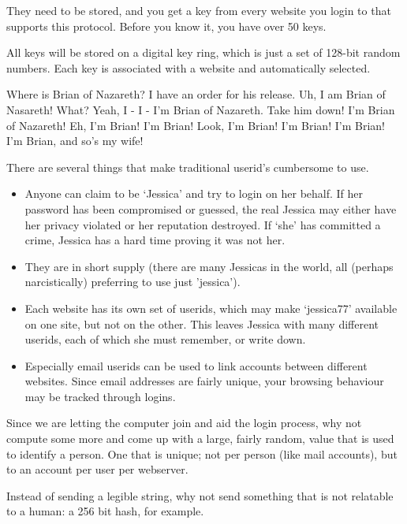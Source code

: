 They need to be stored, and you get a key from every website you login to that supports this protocol.
Before you know it, you have over 50 keys.
\par
All keys will be stored on a digital key ring, which is just a set of 128-bit random numbers.
Each key is associated with a website and automatically selected.
\begin{dialogue}
	Where is Brian of Nazareth? I have an order for his release.
	Uh, I am Brian of Nasareth!
		What?
	Yeah, I - I - I'm Brian of Nazareth.
	Take him down!
	I'm Brian of Nazareth!
	Eh, I'm Brian!
	I'm Brian!
	Look, I'm Brian!
		I'm Brian!
		I'm Brian!
		I'm Brian, and so's my wife!
\end{dialogue}
There are several things that make traditional userid's cumbersome to use.
\begin{itemize}
\item Anyone can claim to be `Jessica' and try to login on her behalf.
If her password has been compromised or guessed,
the real Jessica may either have her privacy violated or her reputation destroyed.
If `she' has committed a crime, Jessica has a hard time proving it was not her.
\item They are in short supply (there are many Jessicas in the world, all (perhaps narcistically) preferring to use just 'jessica').
\item Each website has its own set of userids, which may make `jessica77' available on one site, but not on the other.
This leaves Jessica with many different userids, each of which she must remember, or write down.
\item Especially email userids can be used to link accounts between different websites.
Since email addresses are fairly unique, your browsing behaviour may be tracked through logins.
\end{itemize}
Since we are letting the computer join and aid the login process, why not compute some more and come up with a large, fairly random, value that is used to identify a person.
One that is unique; not per person (like mail accounts), but to an account per user per webserver.
\par
Instead of sending a legible string, why not send something that is not relatable to a human: a 256 bit hash, for example.
